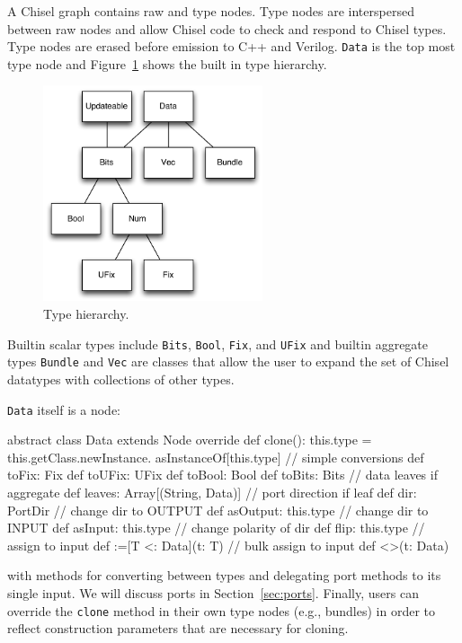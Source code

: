 \documentclass[10pt,twocolumn]{article}
\def\code#1{{\small\tt #1}}
\begin{document}
A Chisel graph contains raw and type nodes.  Type nodes are
interspersed between raw nodes and allow Chisel code to
check and respond to Chisel types.  Type nodes are erased before
emission to C++ and Verilog.  \code{Data} is the top most type node
and Figure~\ref{fig:type-hierarchy} shows the built in type hierarchy.

\begin{figure}[h]
\centering
\includegraphics[height=2.5in]{figs/type-hierarchy.pdf}
\caption{Type hierarchy.}
\label{fig:type-hierarchy}
\end{figure}

\noindent
Builtin scalar types include \code{Bits}, \code{Bool}, \code{Fix}, and
\code{UFix} and builtin aggregate types \code{Bundle} and \code{Vec}
are classes that allow the user to expand
the set of Chisel datatypes with collections of other types.

\code{Data} itself is a node:

\begin{scala}
abstract class Data extends Node {
  override def clone(): this.type =
    this.getClass.newInstance.
      asInstanceOf[this.type]
  // simple conversions
  def toFix: Fix
  def toUFix: UFix
  def toBool: Bool
  def toBits: Bits
  // data leaves if aggregate
  def leaves: Array[(String, Data)]
  // port direction if leaf
  def dir: PortDir
  // change dir to OUTPUT
  def asOutput: this.type
  // change dir to INPUT
  def asInput: this.type
  // change polarity of dir
  def flip: this.type
  // assign to input
  def :=[T <: Data](t: T)
  // bulk assign to input
  def <>(t: Data)
}
\end{scala}

\noindent
with methods for converting between types and 
delegating port methods to its single input.   
We will discuss ports in Section~\ref{sec:ports}.
Finally, users can override the \code{clone} method in their own type nodes (e.g., bundles) in
order to reflect construction parameters that are necessary for cloning.
\end{document}
